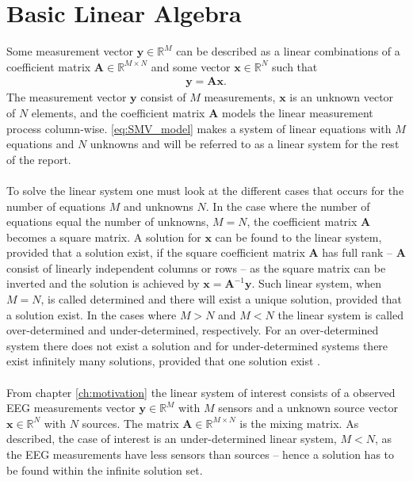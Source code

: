 \section{Basic Linear Algebra}
Some measurement vector $\mathbf{y} \in \mathbb{R}^M$ can be described as a linear combinations of a coefficient matrix $\mathbf{A} \in \mathbb{R}^{M \times N}$ and some vector $\mathbf{x} \in \mathbb{R}^N$ such that
\begin{align}\label{eq:SMV_model}
\mathbf{y} = \mathbf{Ax}.
\end{align}
The measurement vector $\mathbf{y}$ consist of $M$ measurements, $\mathbf{x}$ is an unknown vector of $N$ elements, and the coefficient matrix $\mathbf{A}$ models the linear measurement process column-wise. 
\ref{eq:SMV_model} makes a system of linear equations with $M$ equations and $N$ unknowns and will be referred to as a linear system for the rest of the report.
\\ \\
To solve the linear system one must look at the different cases that occurs for the number of equations $M$ and unknowns $N$.
In the case where the number of equations equal the number of unknowns, $M = N$, the coefficient matrix $\mathbf{A}$ becomes a square matrix. A solution for $\mathbf{x}$ can be found to the linear system, provided that a solution exist, if the square coefficient matrix $\mathbf{A}$ has full rank -- $\mathbf{A}$ consist of linearly independent columns or rows -- as the square matrix can be inverted and the solution is achieved by $\mathbf{x} = \mathbf{A}^{-1} \mathbf{y}$.
Such linear system, when $M = N$, is called determined and there will exist a unique solution, provided that a solution exist. 
In the cases where $M > N$ and $M < N$ the linear system is called over-determined and under-determined, respectively. 
For an over-determined system there does not exist a solution and for under-determined systems there exist infinitely many solutions, provided that one solution exist \cite[p. ix]{CS} .
\\ \\
From chapter \ref{ch:motivation} the linear system of interest consists of a observed EEG measurements vector $\mathbf{y} \in \mathbb{R}^M$ with $M$ sensors and a unknown source vector $\mathbf{x} \in \mathbb{R}^N$ with $N$ sources. The matrix $\mathbf{A} \in \mathbb{R}^{M \times N}$ is the mixing matrix.
As described, the case of interest is an under-determined linear system, $M < N$, as the EEG measurements have less sensors than sources -- hence a solution has to be found within the infinite solution set.

